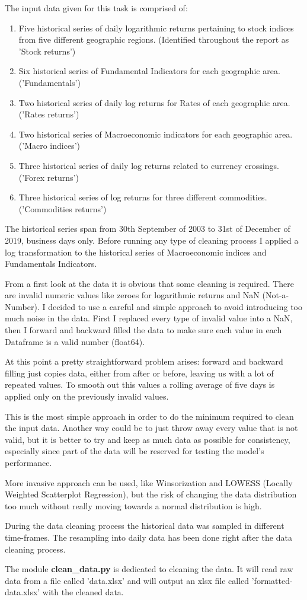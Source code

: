 The input data given for this task is comprised of:
\begin{enumerate}
    \item Five historical series of daily logarithmic returns pertaining to stock indices from five different geographic regions. (Identified throughout the report as 'Stock returns')
    \item Six historical series of Fundamental Indicators for each geographic area. ('Fundamentals')
    \item Two historical series of daily log returns for Rates of each geographic area. ('Rates returns')
    \item Two historical series of Macroeconomic indicators for each geographic area. ('Macro indices')
    \item Three historical series of daily log returns related to currency crossings. ('Forex returns')
    \item Three historical series of log returns for three different commodities. ('Commodities returns')
\end{enumerate}
The historical series span from 30th September of 2003 to 31st of December of 2019, business days only. Before running any type of cleaning process I applied a log transformation to the historical series of Macroeconomic indices and Fundamentals Indicators.


From a first look at the data it is obvious that some cleaning is required. There are invalid numeric values like zeroes for logarithmic returns and NaN (Not-a-Number). I decided to use a careful and simple approach to avoid introducing too much noise in the data. First I replaced every type of invalid value into a NaN, then I forward and backward filled the data to make sure each value in each Dataframe is a valid number (float64). 


At this point a pretty straightforward problem arises: forward and backward filling just copies data, either from after or before, leaving us with a lot of repeated values. To smooth out this values a rolling average of five days is applied only on the previously invalid values.


This is the most simple approach in order to do the minimum required to clean the input data. Another way could be to just throw away every value that is not valid, but it is better to try and keep as much data as possible for consistency, especially since part of the data will be reserved for testing the model's performance.


More invasive approach can be used, like Winsorization and LOWESS (Locally Weighted Scatterplot Regression), but the risk of changing the data distribution too much without really moving towards a normal distribution is high.

During the data cleaning process the historical data was sampled in different time-frames. The resampling into daily data has been done right after the data cleaning process.

The module \textbf{clean\_data.py} is dedicated to cleaning the data. It will read raw data from a file called 'data.xlsx' and will output an xlsx file called 'formatted-data.xlsx' with the cleaned data.